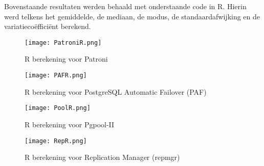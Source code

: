 \begin{table}[!h]
    \centering
    \caption{Statistieken requirements}
    \label{table:Statistieken requirements}
\end{table}



Bovenstaande resultaten werden behaald met onderstaande code in R. Hierin werd telkens het gemiddelde, de mediaan, de modus, de standaardafwijking en de variatiecoëfficiënt berekend.

\begin{figure}[!h]
    \centering
    \texttt{[image: PatroniR.png]}
    \caption{R berekening voor Patroni}
    \label{fig:R berekening voor Patroni}
\end{figure}

\begin{figure}[!h]
    \centering
    \texttt{[image: PAFR.png]}
    \caption{R berekening voor PostgreSQL Automatic Failover (PAF)}
    \label{fig:R berekening voor PostgreSQL Automatic Failover (PAF)}
\end{figure}

\begin{figure}[!h]
    \centering
    \texttt{[image: PoolR.png]}
    \caption{R berekening voor Pgpool-II}
    \label{fig:R berekening voor Pgpool-II}
\end{figure}

\begin{figure}[!h]
    \centering
    \texttt{[image: RepR.png]}
    \caption{R berekening voor Replication Manager (repmgr)}
    \label{fig:R berekening voor Replication Manager (repmgr)}
\end{figure}

